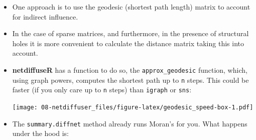 \documentclass[]{book}
\newenvironment{Shaded}{\begin{snugshade}}{\end{snugshade}}
\newcommand{\CommentTok}[1]{\textcolor[rgb]{0.56,0.35,0.01}{\textit{#1}}}
\newcommand{\DataTypeTok}[1]{\textcolor[rgb]{0.13,0.29,0.53}{#1}}
\newcommand{\DecValTok}[1]{\textcolor[rgb]{0.00,0.00,0.81}{#1}}
\newcommand{\KeywordTok}[1]{\textcolor[rgb]{0.13,0.29,0.53}{\textbf{#1}}}
\newcommand{\NormalTok}[1]{#1}
\newcommand{\OperatorTok}[1]{\textcolor[rgb]{0.81,0.36,0.00}{\textbf{#1}}}
\newcommand{\StringTok}[1]{\textcolor[rgb]{0.31,0.60,0.02}{#1}}
\begin{document}
\begin{itemize}
\item
  One approach is to use the geodesic (shortest path length) matrix to account for indirect
  influence.
\item
  In the case of sparse matrices, and furthermore, in the presence of structural holes
  it is more convenient to calculate the distance matrix taking this into account.
\item
  \textbf{netdiffuseR} has a function to do so, the \texttt{approx\_geodesic} function, which,
  using graph powers, computes the shortest path up to \texttt{n} steps. This could be
  faster (if you only care up to \texttt{n} steps) than \texttt{igraph} or \texttt{sns}:

\begin{Shaded}
\end{Shaded}

  \texttt{[image: 08-netdiffuser\_files/figure-latex/geodesic\_speed-box-1.pdf]}
\item
  The \texttt{summary.diffnet} method already runs Moran's for you. What happens under the hood is:

\begin{Shaded}
\end{Shaded}
\end{itemize}
\end{document}
